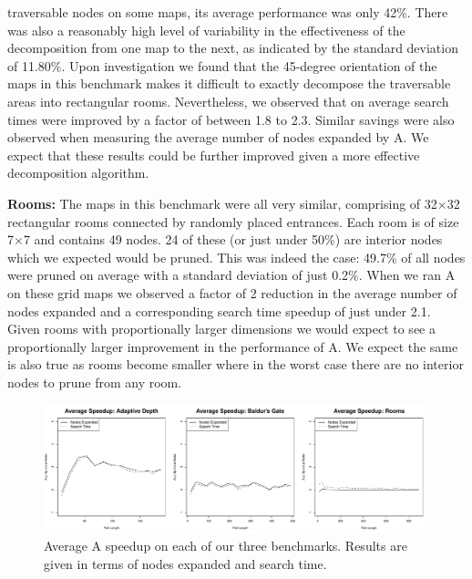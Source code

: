 traversable nodes on some maps, its average performance was only
42\%.  There was also a reasonably high level of variability in the
effectiveness of the decomposition from one map to the next, as
indicated by the standard deviation of 11.80\%.  Upon investigation
we found that the 45-degree orientation of the maps in this benchmark
makes it difficult to exactly decompose the traversable areas into
 rectangular rooms.
Nevertheless, we observed that on average search times were improved by a factor
of between 1.8 to 2.3. 
Similar savings were also observed when measuring the average number of nodes
expanded by A\*.
We expect that these results could be
further improved given a more effective decomposition algorithm.
\par 
\textbf{Rooms:} 
The maps in this benchmark were all very similar, comprising of
32$\times$32 rectangular rooms connected by randomly placed entrances.
Each room is of size 7$\times$7 and contains 49 nodes.  24 of these
(or just under 50\%) are interior nodes which we expected would be
pruned.  This was indeed the case: 49.7\% of all nodes were pruned
on average with a standard deviation of just 0.2\%.  
When we ran A\* on these grid maps we observed a factor of 2 reduction 
in the average number of nodes expanded and a corresponding search time
speedup of just under 2.1.
Given rooms with proportionally larger dimensions
we would expect to see a proportionally larger improvement in the
performance of A\*.  We expect the same is also true as rooms become
smaller where in the worst case there are no interior nodes to prune
from any room.

\begin{figure}[t]
       \begin{center}
                       \includegraphics[width=1.95\columnwidth, trim = 10mm 10mm 10mm 0mm]{diagrams/speedup.pdf}
       \end{center}
       \caption{Average A\* speedup on each of our three benchmarks. 
		Results are given in terms of nodes expanded and search time.}
\label{fig-speedup}
\end{figure}
